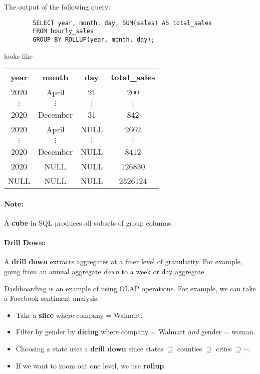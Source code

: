\documentclass{report}
\newenvironment{example}{\begin{tcolorbox}[title={Example},colback=green!5!white,colframe=black!75!green]}{\end{tcolorbox}}
\renewcommand{\bf}[1]{\textbf{{#1}}}
\renewcommand{\it}[1]{\textit{{#1}}}
\begin{document}
\begin{example}
    The output of the following query:
    \begin{BVerbatim}
        SELECT year, month, day, SUM(sales) AS total_sales
        FROM hourly_sales
        GROUP BY ROLLUP(year, month, day);
    \end{BVerbatim}
    looks like
    \centering
    \begin{tabular}{c|c|c|c}
        year & month & day & total\_sales \\
        \hline
        2020 & April & 21 & 200 \\
        $\vdots$ & $\vdots$ & $\vdots$ & $\vdots$ \\
        2020 & December & 31 & 842 \\
        2020 & April & NULL & 2662 \\
        $\vdots$ & $\vdots$ & $\vdots$ & $\vdots$ \\
        2020 & December & NULL & 8412 \\
        2020 & NULL & NULL & 126830 \\
        NULL & NULL & NULL & 2526124
    \end{tabular}
    \paragraph{Note:} A \bf{cube} in SQL produces all subsets of group columns.
\end{example}

\paragraph{Drill Down:} A \bf{drill down} extracts aggregates at a finer level
of granularity. For example, going from an annual aggregate \it{down} to a week
or day aggregate.

\begin{example}
    Dashboarding is an example of using OLAP operations. For example,
    we can take a Facebook sentiment analysis.
    \begin{itemize}[label=$\to$]
        \item Take a \bf{slice} where company = Walmart.
        \item Filter by gender by \bf{dicing} where company = Walmart \it{and}
            gender = woman.
        \item Choosing a state uses a \bf{drill down} since states $\supseteq$
            counties $\supseteq$ cities $\supseteq \cdots$.
        \item If we want to zoom out one level, we use \bf{rollup}.
    \end{itemize}
\end{example}
\end{document}
